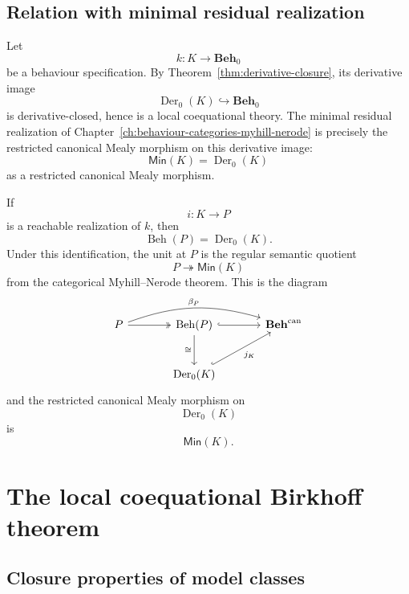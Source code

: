 \subsection{Relation with minimal residual realization}
\label{subsec:universal-realization-minimal-residual-realization}

\begin{remark}
\label{rem:universal-realization-minimal-residual-realization}
    Let
    \[
        k:K\to\mathbf{Beh}_0
    \]
    be a behaviour specification. By
    Theorem~\ref{thm:derivative-closure}, its derivative image
    \[
        \operatorname{Der}_0(K)\hookrightarrow\mathbf{Beh}_0
    \]
    is derivative-closed, hence is a local coequational theory. The minimal
    residual realization of
    Chapter~\ref{ch:behaviour-categories-myhill-nerode} is precisely the
    restricted canonical Mealy morphism on this derivative image:
    \[
        \mathsf{Min}(K)
        =
        \operatorname{Der}_0(K)
    \]
    as a restricted canonical Mealy morphism.

    If
    \[
        i:K\to P
    \]
    is a reachable realization of \(k\), then
    \[
        \operatorname{Beh}(P)
        =
        \operatorname{Der}_0(K).
    \]
    Under this identification, the unit at \(P\) is the regular semantic
    quotient
    \[
        P\twoheadrightarrow\mathsf{Min}(K)
    \]
    from the categorical Myhill--Nerode theorem. This is the diagram
    \[
    \begin{tikzcd}[column sep=large, row sep=large]
        P
            \arrow[r, two heads]
            \arrow[rr, bend left=18, "\beta_P"]
        &
        \operatorname{Beh}(P)
            \arrow[r, hook]
            \arrow[d, "\cong"']
        &
        \mathbf{Beh}^{\mathrm{can}}
        \\
        &
        \operatorname{Der}_0(K)
            \arrow[ur, hook, "j_K"']
        &
    \end{tikzcd}
    \]
    and the restricted canonical Mealy morphism on
    \[
        \operatorname{Der}_0(K)
    \]
    is
    \[
        \mathsf{Min}(K).
    \]
\end{remark}

\section{The local coequational Birkhoff theorem}
\label{sec:local-coequational-birkhoff}

\subsection{Closure properties of model classes}
\label{subsec:closure-properties-model-classes}

